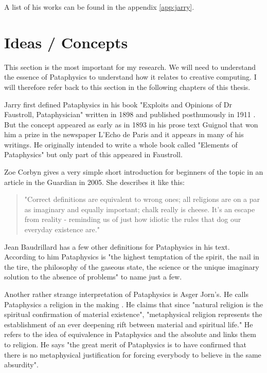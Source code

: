 A list of his works can be found in the appendix \ref{app:jarry}.


\section{Ideas / Concepts}

This section is the most important for my research. We will need to understand the essence of Pataphysics to understand how it relates to creative computing. I will therefore refer back to this section in the following chapters of this thesis.

Jarry first defined Pataphysics in his book "Exploits and Opinions of Dr Faustroll, Pataphysician" written in 1898 and published posthumously in 1911 \citep{Jarry1996}. But the concept appeared as early as in 1893 in his prose text Guignol that won him a prize in the newspaper L'Echo de Paris and it appears in many of his writings. He originally intended to write a whole book called "Elements of Pataphysics" but only part of this appeared in Faustroll.

Zoe Corbyn gives a very simple short introduction for beginners of the topic in an article in the Guardian \citep{Corbyn2005} in 2005. She describes it like this:

\begin{quote}
  "Correct definitions are equivalent to wrong ones; all religions are on a par as imaginary and equally important; chalk really is cheese. It's an escape from reality - reminding us of just how idiotic the rules that dog our everyday existence are."\citep{Jarry1996}
\end{quote}

Jean Baudrillard has a few other definitions for Pataphysics in his text\citep{Baudrillard2007}. According to him Pataphysics is "the highest temptation of the spirit, the nail in the tire, the philosophy of the gaseous state, the science or the unique imaginary solution to the absence of problems" to name just a few.

Another rather strange interpretation of Pataphysics is Asger Jorn's. He calls Pataphysics a religion in the making \citep{Jorn1961}. He claims that since "natural religion is the spiritual confirmation of material existence", "metaphysical religion represents the establishment of an ever deepening rift between material and spiritual life." He refers to the idea of equivalence in Pataphysics and the absolute and links them to religion. He says "the great merit of Pataphysics is to have confirmed that there is no metaphysical justification for forcing everybody to believe in the same absurdity".

